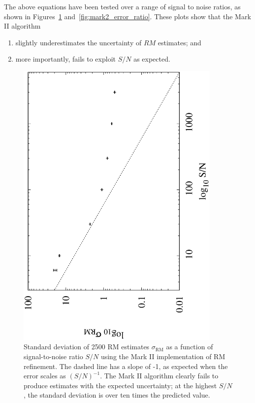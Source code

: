 \documentclass[12pt]{article}
\begin{document}
The above equations have been tested over a range of signal to noise ratios, as shown in
Figures~\ref{fig:mark2_error} and~\ref{fig:mark2_error_ratio}.  These plots show that
the Mark II algorithm

\begin{enumerate}
\item slightly underestimates the uncertainty of $RM$ estimates; and 
\item more importantly, fails to exploit $S/N$ as expected.
\end{enumerate}

\begin{figure}
\centerline{\includegraphics[angle=-90,width=100mm]{plots/mark2_error.eps}}
\caption{\label{fig:mark2_error}
Standard deviation of 2500 RM estimates $\sigma_\mathrm{RM}$ as a function of signal-to-noise ratio $S/N$
using the Mark II implementation of RM refinement.  The dashed line has a slope of -1, as expected when
the error scales as $(S/N)^{-1}$.  The Mark II algorithm clearly fails to produce estimates with the expected
uncertainty; at the highest $S/N$, the standard deviation is over ten times the predicted value.}
\end{figure}
\end{document}
